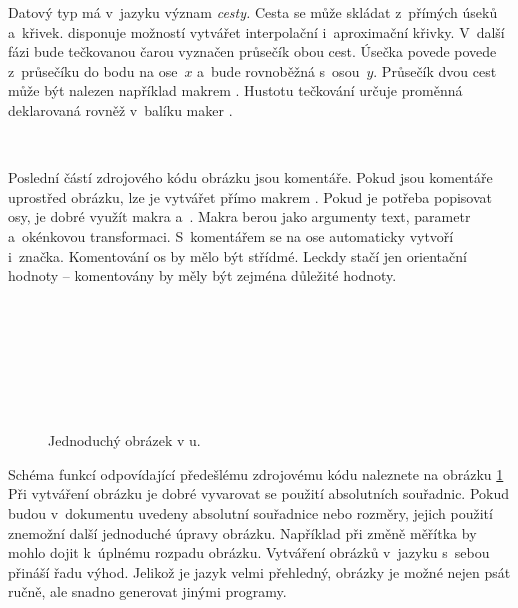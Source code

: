 \documentclass[12pt]{article}
\begin{document}
Datový typ  má v~jazyku \MP{} význam \emph{cesty.}
Cesta se může skládat z~přímých úseků a~křivek. \MP{} disponuje možností
vytvářet interpolační i~aproximační křivky. 
V~další fázi bude tečkovanou čarou vyznačen průsečík obou cest. Úsečka povede
povede z~průsečíku do bodu na ose~$x$ a~bude rovnoběžná s~osou~$y$.
Průsečík dvou cest může být nalezen například makrem .
Hustotu tečkování určuje proměnná  deklarovaná rovněž 
v~balíku maker .

\begin{flushleft}
   \\
\end{flushleft}

Poslední částí zdrojového kódu obrázku jsou komentáře.
Pokud jsou komentáře uprostřed obrázku, lze je vytvářet přímo makrem
. Pokud je potřeba popisovat osy, je dobré využít makra 
 a~. 
Makra berou jako argumenty text, parametr a~okénkovou transformaci.
S~komentářem se na ose automaticky vytvoří i~značka. 
Komentování os by mělo být střídmé. Leckdy stačí jen orientační hodnoty --
komentovány by měly být zejména důležité hodnoty.

\begin{flushleft}
   \\
   \\
   \\
   \\
   \\
   \\
\end{flushleft}

\begin{figure}
  \centerline{}
  \caption{Jednoduchý obrázek v \MP u.}
  \label{mpost_fig}
\end{figure}

Schéma funkcí odpovídající předešlému zdrojovému kódu naleznete 
na obrázku \ref{mpost_fig}
Při vytváření obrázku je dobré vyvarovat se použití absolutních souřadnic.
Pokud budou v~dokumentu uvedeny absolutní souřadnice nebo rozměry, 
jejich použití znemožní další jednoduché úpravy obrázku. Například při změně
měřítka by mohlo dojit k~úplnému rozpadu obrázku. Vytváření obrázků v~jazyku
\mbox{\MP{}} s~sebou přináší řadu výhod. 
Jelikož je jazyk velmi přehledný, obrázky je možné nejen psát ručně,
ale snadno generovat jinými programy.
\end{document}
